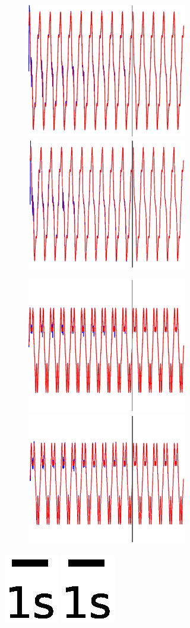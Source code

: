 \begin{figure}
\begin{subfigure}{\textwidth}
\begin{subfigure}{\textwidth}
        \end{subfigure}
         
        
        
        \textbf{}\begin{subfigure}{\textwidth}
        \centering
        
        \includegraphics[height=0.08\linewidth,width=.4\linewidth]{Figures/Fig_T1/MATLAB/ST_T1_CoordinateX}
        \includegraphics[trim=2cm 1cm 2cm 1cm, clip=true,height=0.08\linewidth,width=.45\linewidth]{Figures/Fig_T1/Python/ST_T1_CoordinateX}
        
        \end{subfigure}
         
        
        
        \textbf{}\begin{subfigure}{\textwidth}
        \centering
        
        \includegraphics[height=0.08\linewidth,width=.4\linewidth]{Figures/Fig_T1/MATLAB/ST_T1_CoordinateY}
        \includegraphics[trim=2cm 1cm 2cm 1cm, clip=true,height=0.08\linewidth,width=.45\linewidth]{Figures/Fig_T1/Python/ST_T1_CoordinateY}
        
        \end{subfigure}
        
        
        
        \includegraphics[trim=2cm 6cm 2cm 6cm, clip=true,height=0.05\linewidth,width=.4\linewidth]{Figures/Fig_T1/Python/ST_T1_Scale.eps}
        \includegraphics[trim=2cm 4cm 2cm 6cm, clip=true,height=0.05\linewidth,width=.45\linewidth]{Figures/Fig_T1/Python/ST_T1_Scale.eps}
        


\end{subfigure}
\end{figure}
